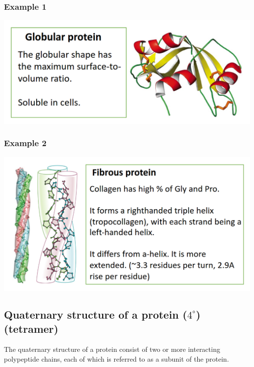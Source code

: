 \documentclass[11pt]{article}
\begin{document}
\subsubsection{Example 1}
\label{sec:org14c317e}
\begin{center}
\includegraphics[width=.9\linewidth]{./images/globular-protein.png}
\end{center}
\subsubsection{Example 2}
\label{sec:orgde86c6e}
\begin{center}
\includegraphics[width=.9\linewidth]{./images/fibrous-protein.png}
\end{center}

\newpage
\subsection{Quaternary structure of a protein (\(4^{\circ}\)) (tetramer)}
\label{sec:org4511a0e}
The quaternary structure of a protein consist of two or more interacting polypeptide chains, each of which is referred to as a subunit of the protein.
\end{document}
